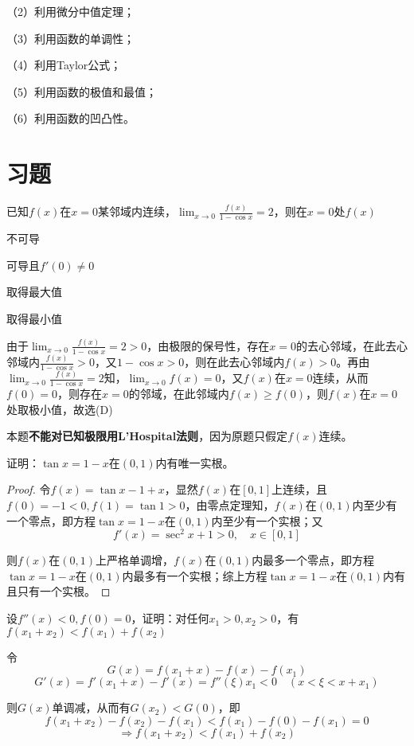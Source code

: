 （2）利用微分中值定理；

（3）利用函数的单调性；

（4）利用Taylor公式；

（5）利用函数的极值和最值；

（6）利用函数的凹凸性。

\section{习题}
\begin{problem}
	已知$f(x)$在$x=0$某邻域内连续，$\lim_{x\to 0}\frac{f(x)}{1-\cos{x}}=2$，则在$x=0$处$f(x)$\xparen
	\begin{xchoices}[showanswer=true]
		\item 不可导
		\item 可导且$f'(0)\neq 0$
		\item 取得最大值
		\item* 取得最小值
	\end{xchoices}
	\vspace{0.5em}
	\begin{solution}
		由于$\lim_{x\to 0}\frac{f(x)}{1-\cos{x}}=2>0$，由极限的保号性，存在$x=0$的去心邻域，在此去心邻域内$\frac{f(x)}{1-\cos{x}}>0$，又$1-\cos{x}>0$，则在此去心邻域内$f(x)>0$。再由$\lim_{x\to 0}\frac{f(x)}{1-\cos{x}}=2$知，$\lim_{x\to 0}f(x)=0$，又$f(x)$在$x=0$连续，从而$f(0)=0$，则存在$x=0$的邻域，在此邻域内$f(x)\geq f(0)$，则$f(x)$在$x=0$处取极小值，故选(D)
	\end{solution}
\end{problem}
\begin{remark}
	本题\textbf{不能对已知极限用L'Hospital法则}，因为原题只假定$f(x)$连续。
\end{remark}

\begin{problem}
	证明：$\tan{x}=1-x$在$(0,1)$内有唯一实根。
	\begin{proof}
		令$f(x)=\tan{x}-1+x$，显然$f(x)$在$[0,1]$上连续，且$f(0)=-1<0,f(1)=\tan{1}>0$，由零点定理知，$f(x)$在$(0,1)$内至少有一个零点，即方程$\tan{x}=1-x$在$(0,1)$内至少有一个实根；又
        \[f'(x)=\sec^2{x}+1>0,\quad x\in [0,1]\]

        则$f(x)$在$(0,1)$上严格单调增，$f(x)$在$(0,1)$内最多一个零点，即方程$\tan{x}=1-x$在$(0,1)$内最多有一个实根；综上方程$\tan{x}=1-x$在$(0,1)$内有且只有一个实根。
	\end{proof}
\end{problem}
\begin{problem}
	设$f''(x)<0,f(0)=0$，证明：对任何$x_1>0,x_2>0$，有$f(x_1+x_2)<f(x_1)+f(x_2)$
	\begin{solution}
		令\[G(x)=f(x_1+x)-f(x)-f(x_1)\]
        \[G'(x)=f'(x_1+x)-f'(x)=f''(\xi)x_1<0\quad(x<\xi <x+x_1)\]

        则$G(x)$单调减，从而有$G(x_2)<G(0)$，即
        \[f(x_1+x_2)-f(x_2)-f(x_1)<f(x_1)-f(0)-f(x_1)=0\]
        \[\Rightarrow f(x_1+x_2)<f(x_1)+f(x_2)\]
	\end{solution}
\end{problem}

